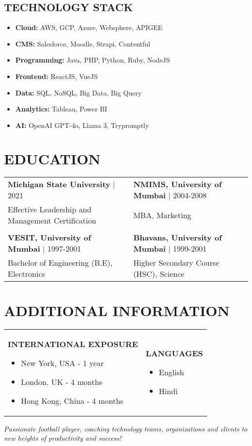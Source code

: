 \documentclass[a4paper,11pt]{article}
\newcommand{\skillitem}[1]{\item[\textbullet] #1}
\begin{document}
\subsection{TECHNOLOGY STACK}
\begin{multicols}{2}
\begin{itemize}[leftmargin=*]
    \skillitem{\textbf{Cloud:} AWS, GCP, Azure, Websphere, APIGEE}
    \skillitem{\textbf{CMS:} Salesforce, Moodle, Strapi, Contentful}
    \skillitem{\textbf{Programming:} Java, PHP, Python, Ruby, NodeJS}
    \skillitem{\textbf{Frontend:} ReactJS, VueJS}
    \skillitem{\textbf{Data:} SQL, NoSQL, Big Data, Big Query}
    \skillitem{\textbf{Analytics:} Tableau, Power BI}
    \skillitem{\textbf{AI:} OpenAI GPT-4o, Llama 3, Trypromptly}
\end{itemize}
\end{multicols}

\section{EDUCATION}

\begin{tabularx}{\textwidth}{X X}
    \textbf{Michigan State University} | 2021 & \textbf{NMIMS, University of Mumbai} | 2004-2008 \\
    Effective Leadership and Management Certification & MBA, Marketing \\
    & \\
    \textbf{VESIT, University of Mumbai} | 1997-2001 & \textbf{Bhavans, University of Mumbai} | 1999-2001 \\
    Bachelor of Engineering (B.E), Electronics & Higher Secondary Course (HSC), Science \\
\end{tabularx}

\section{ADDITIONAL INFORMATION}

\begin{tabularx}{\textwidth}{X X}
\begin{minipage}[t]{0.45\textwidth}
    \textbf{INTERNATIONAL EXPOSURE}
    \begin{itemize}[leftmargin=*]
        \skillitem{New York, USA - 1 year}
        \skillitem{London, UK - 4 months}
        \skillitem{Hong Kong, China - 4 months}
    \end{itemize}
\end{minipage}
&
\begin{minipage}[t]{0.45\textwidth}
    \textbf{LANGUAGES}
    \begin{itemize}[leftmargin=*]
        \skillitem{English}
        \skillitem{Hindi}
    \end{itemize}
\end{minipage}
\end{tabularx}

\vspace{1em}
\begin{center}
    \textit{Passionate football player, coaching technology teams, organizations and clients to new heights of productivity and success!}
\end{center}
\end{document}
